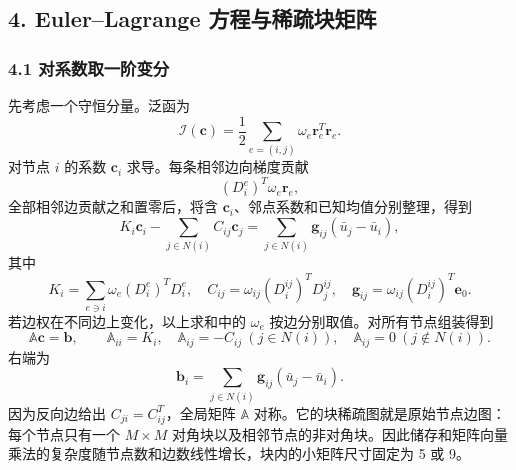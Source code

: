 \documentclass[
  12pt,
  UTF8]{ctexart}
\begin{document}
\hypertarget{eulerlagrange-ux65b9ux7a0bux4e0eux7a00ux758fux5757ux77e9ux9635}{%
\subsection{4. Euler--Lagrange
方程与稀疏块矩阵}\label{eulerlagrange-ux65b9ux7a0bux4e0eux7a00ux758fux5757ux77e9ux9635}}

\hypertarget{ux5bf9ux7cfbux6570ux53d6ux4e00ux9636ux53d8ux5206}{%
\subsubsection{4.1
对系数取一阶变分}\label{ux5bf9ux7cfbux6570ux53d6ux4e00ux9636ux53d8ux5206}}

先考虑一个守恒分量。泛函为 \begin{equation}
\mathcal I(\boldsymbol c)=\frac12\sum_{e=(i,j)}\omega_e
\boldsymbol r_e^T\boldsymbol r_e.\end{equation} 对节点 \(i\) 的系数 \(\boldsymbol c_i\) 求导。每条相邻边向梯度贡献 \begin{equation}
(D_i^e)^T\omega_e\boldsymbol r_e,\end{equation} 全部相邻边贡献之和置零后，将含
\(\boldsymbol c_i\)、邻点系数和已知均值分别整理，得到 \begin{equation}
\boxed{
K_i\boldsymbol c_i-
\sum_{j\in N(i)}C_{ij}\boldsymbol c_j=
\sum_{j\in N(i)}\boldsymbol g_{ij}(\bar u_j-\bar u_i),}\end{equation} 其中 \begin{equation}
K_i=\sum_{e\ni i}\omega_e(D_i^e)^TD_i^e,\quad
C_{ij}=\omega_{ij}(D_i^{ij})^TD_j^{ij},\quad
\boldsymbol g_{ij}=\omega_{ij}(D_i^{ij})^T\boldsymbol e_0.\end{equation} 若边权在不同边上变化，以上求和中的 \(\omega_e\)
按边分别取值。对所有节点组装得到 \begin{equation}
\boxed{\mathbb A\boldsymbol c=\boldsymbol b,\qquad
\mathbb A_{ii}=K_i,\quad
\mathbb A_{ij}=-C_{ij}\ (j\in N(i)),\quad
\mathbb A_{ij}=0\ (j\notin N(i)).}\end{equation} 右端为 \begin{equation}
\boldsymbol b_i=\sum_{j\in N(i)}\boldsymbol g_{ij}(\bar u_j-\bar u_i).\end{equation} 因为反向边给出 \(C_{ji}=C_{ij}^T\)，全局矩阵 \(\mathbb A\)
对称。它的块稀疏图就是原始节点边图：每个节点只有一个 \(M\times M\)
对角块以及相邻节点的非对角块。因此储存和矩阵向量乘法的复杂度随节点数和边数线性增长，块内的小矩阵尺寸固定为
5 或 9。
\end{document}
